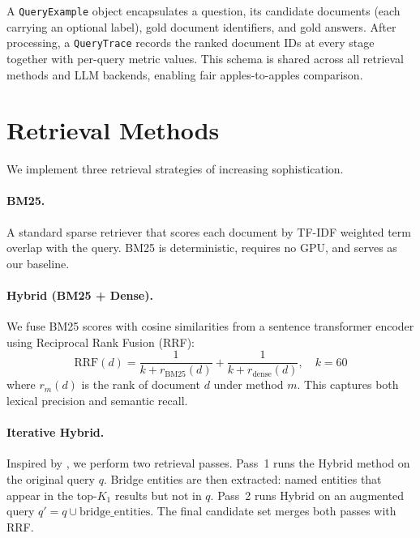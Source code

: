 \documentclass{article}
\begin{document}
A \texttt{QueryExample} object encapsulates a question, its candidate
documents (each carrying an optional label), gold document identifiers,
and gold answers.  After processing, a \texttt{QueryTrace} records the
ranked document IDs at every stage together with per-query metric values.
This schema is shared across all retrieval methods and LLM backends,
enabling fair apples-to-apples comparison.

\section{Retrieval Methods}
\label{sec:retrieval}

We implement three retrieval strategies of increasing sophistication.

\paragraph{BM25.}
A standard sparse retriever \citep{robertson2009bm25} that scores
each document by TF-IDF weighted term overlap with the query.  BM25
is deterministic, requires no GPU, and serves as our baseline.

\paragraph{Hybrid (BM25 + Dense).}
We fuse BM25 scores with cosine similarities from a sentence
transformer encoder \citep{reimers2019sentencebert} using Reciprocal
Rank Fusion (RRF):
\begin{equation}
  \text{RRF}(d) = \frac{1}{k + r_{\text{BM25}}(d)}
                + \frac{1}{k + r_{\text{dense}}(d)}, \quad k=60
\end{equation}
where $r_m(d)$ is the rank of document $d$ under method $m$.  This
captures both lexical precision and semantic recall.

\paragraph{Iterative Hybrid.}
Inspired by \citet{asai2023selfrag}, we perform two retrieval passes.
Pass~1 runs the Hybrid method on the original query $q$.  Bridge
entities are then extracted: named entities that appear in the
top-$K_1$ results but not in $q$.  Pass~2 runs Hybrid on an augmented
query $q' = q \cup \text{bridge\_entities}$.  The final candidate set
merges both passes with RRF.
\end{document}
